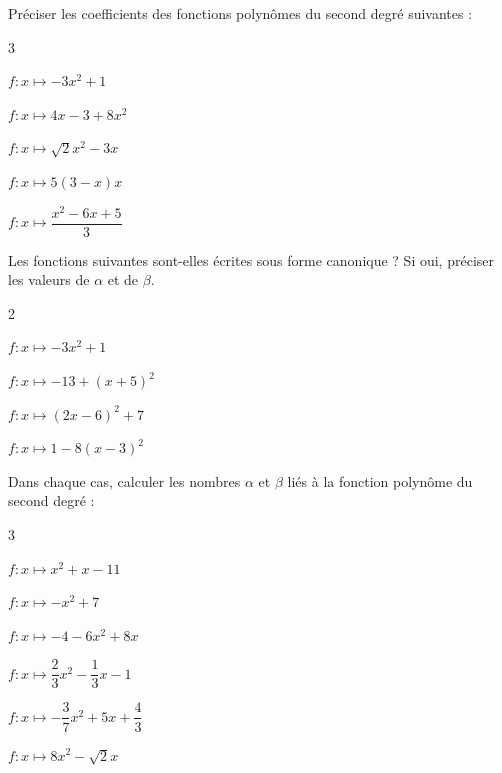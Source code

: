 \documentclass[11pt,a4paper]{article}  %
\begin{document}
	\graphicspath{{images/}}
	
	\begin{center}
		
		
	\end{center}



Préciser les coefficients des fonctions polynômes du second degré suivantes :


\begin{multicols}{3}
	\begin{enumMet}
		\item $f: x \mapsto-3 x^2+1$
		\item $f: x \mapsto 4 x-3+8 x^2$
		\item $f: x \mapsto \sqrt{2} x^2-3 x$
		\item $f: x \mapsto 5(3-x) x$
		\item $f: x \mapsto \dfrac{x^2-6 x+5}{3}$
	\end{enumMet}
\end{multicols}




Les fonctions suivantes sont-elles écrites sous forme canonique ? Si oui, préciser les valeurs de $\alpha$ et de $\beta$.
\begin{multicols}{2}
	\begin{enumMet}
		\item $f: x \mapsto-3 x^2+1$
		\item $f: x \mapsto-13+(x+5)^2$
		\item $f: x \mapsto(2 x-6)^2+7$
		\item $f: x \mapsto 1-8(x-3)^2$
	\end{enumMet}
\end{multicols}


Dans chaque cas, calculer les nombres $\alpha$ et $\beta$ liés à la fonction polynôme du second degré :
\begin{multicols}{3}
	\begin{enumMet}
		\item $f: x \mapsto x^2+x-11$
		\item $f: x \mapsto-x^2+7$
		\item $f: x \mapsto-4-6 x^2+8 x$
		\item $f: x \mapsto \dfrac{2}{3} x^2-\dfrac{1}{3} x-1$
		\item $f: x \mapsto-\dfrac{3}{7} x^2+5 x+\dfrac{4}{3}$
		\item $f: x \mapsto 8 x^2-\sqrt{2}x$
	\end{enumMet}
\end{multicols}
\end{document}
